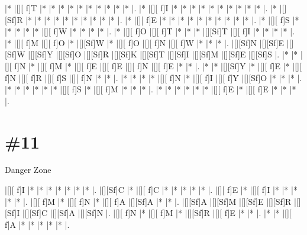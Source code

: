 \documentclass[letterpaper]{article}
\begin{document}
\vspace*{1em}
\begin{Puzzle}{12}{13}
|*        |[][ f]T  |*        |*        |*        |*        |*        |*        |*        |*        |*        |*        |.
|*        |[][ f]I  |*        |*        |*        |*        |*        |*        |*        |*        |*        |*        |.
|*        |[][Sf]R  |*        |*        |*        |*        |*        |*        |*        |*        |*        |*        |.
|*        |[][ f]E  |*        |*        |*        |*        |*        |*        |*        |*        |*        |*        |.
|*        |[][ f]S  |*        |*        |*        |*        |*        |[][ f]W  |*        |*        |*        |*        |.
|*        |[][ f]O  |[][ f]T  |*        |*        |*        |[][Sf]T  |[][ f]I  |*        |*        |*        |*        |.
|*        |[][ f]M  |[][ f]O  |*        |[][Sf]W  |*        |[][ f]O  |[][ f]N  |[][ f]W  |*        |*        |*        |.
|[][Sf]N  |[][Sf]E  |[][Sf]W  |[][Sf]Y  |[][Sf]O  |[][Sf]R  |[][Sf]K  |[][Sf]T  |[][Sf]I  |[][Sf]M  |[][Sf]E  |[][Sf]S  |.
|*        |*        |[][ f]N  |*        |[][ f]M  |*        |[][ f]E  |[][ f]E  |[][ f]N  |[][ f]E  |*        |*        |.
|*        |*        |[][Sf]Y  |*        |[][ f]E  |*        |[][ f]N  |[][ f]R  |[][ f]S  |[][ f]N  |*        |*        |.
|*        |*        |*        |*        |[][ f]N  |*        |[][ f]I  |[][ f]Y  |[][Sf]O  |*        |*        |*        |.
|*        |*        |*        |*        |*        |*        |[][ f]S  |*        |[][ f]M  |*        |*        |*        |.
|*        |*        |*        |*        |*        |*        |[][ f]E  |*        |[][ f]E  |*        |*        |*        |.
\end{Puzzle}


\section*{\#11}
Danger Zone

\vspace*{1em}
\begin{Puzzle}{8}{7}
|[][ f]I  |*        |*        |*        |*        |*        |*        |*        |. 
|[][Sf]C  |*        |[][ f]C  |*        |*        |*        |*        |*        |.  
|[][ f]E  |*        |[][ f]I  |*        |*        |*        |*        |*        |.
|[][ f]M  |*        |[][ f]N  |*        |[][ f]A  |[][Sf]A  |*        |*        |.  
|[][Sf]A  |[][Sf]M  |[][Sf]E  |[][Sf]R  |[][Sf]I  |[][Sf]C  |[][Sf]A  |[][Sf]N  |.
|[][ f]N  |*        |[][ f]M  |*        |[][Sf]R  |[][ f]E  |*        |*        |. 
|*        |*        |[][ f]A  |*        |*        |*        |*        |*        |.
\end{Puzzle}
\end{document}
